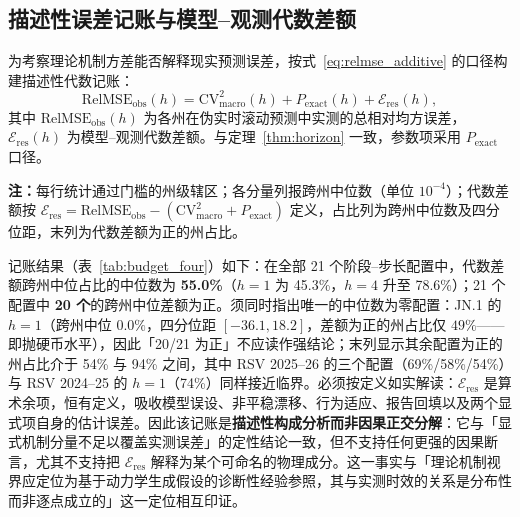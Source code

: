 \documentclass[10pt,UTF8,a4paper,zihao=-4]{ctexart}
\theoremstyle{plain}
\theoremstyle{definition}
\theoremstyle{remark}
\begin{document}
\begin{table}[htbp]
\centering
\footnotesize
\setlength{\tabcolsep}{4pt}
\caption{各阶段州级中位机制视界的联合自助 95\% 区间（同时传播辖区抽样变异与增长乘子估计误差）}
\label{tab:joint_ci}

\end{table}

\begin{table}[htbp]
\centering
\footnotesize
\setlength{\tabcolsep}{4pt}
\caption{准入门槛放宽后各阶段州级中位机制视界（周）与参与辖区数（括号内为 $n$）}
\label{tab:threshold_sweep}

\end{table}

\subsection{描述性误差记账与模型--观测代数差额}\label{sec:budget}

为考察理论机制方差能否解释现实预测误差，按式~\eqref{eq:relmse_additive} 的口径构建描述性代数记账：
\begin{equation}
\text{RelMSE}_{\text{obs}}(h) = \text{CV}^2_{\text{macro}}(h) + P_{\text{exact}}(h) + \mathcal{E}_{\text{res}}(h),
\label{eq:full_budget}
\end{equation}
其中 $\text{RelMSE}_{\text{obs}}(h)$ 为各州在伪实时滚动预测中实测的总相对均方误差，$\mathcal{E}_{\text{res}}(h)$ 为模型--观测代数差额。与定理~\ref{thm:horizon} 一致，参数项采用 $P_{\text{exact}}$ 口径。

\begin{table}[htbp]
\centering
\footnotesize
\caption{两项显式模型分量与模型--观测代数差额的描述性误差记账州级分解}
\label{tab:budget_four}
\setlength{\tabcolsep}{3pt}

\vspace{2pt}
\begin{flushleft}
\scriptsize \textbf{注：}每行统计通过门槛的州级辖区；各分量列报跨州中位数（单位 $10^{-4}$）；代数差额按 $\mathcal{E}_{\text{res}} = \text{RelMSE}_{\text{obs}} - (\text{CV}^2_{\text{macro}} + P_{\text{exact}})$ 定义，占比列为跨州中位数及四分位距，末列为代数差额为正的州占比。
\end{flushleft}
\end{table}

记账结果（表~\ref{tab:budget_four}）如下：在全部 21 个阶段--步长配置中，代数差额跨州中位占比的中位数为 \textbf{55.0\%}（$h=1$ 为 45.3\%，$h=4$ 升至 78.6\%）；21 个配置中 \textbf{20 个}的跨州中位差额为正。须同时指出唯一的中位数为零配置：JN.1 的 $h=1$（跨州中位 $0.0\%$，四分位距 $[-36.1, 18.2]$，差额为正的州占比仅 $49\%$——即抛硬币水平），因此「20/21 为正」不应读作强结论；末列显示其余配置为正的州占比介于 54\% 与 94\% 之间，其中 RSV 2025--26 的三个配置（69\%/58\%/54\%）与 RSV 2024--25 的 $h=1$（74\%）同样接近临界。必须按定义如实解读：$\mathcal{E}_{\text{res}}$ 是算术余项，恒有定义，吸收模型误设、非平稳漂移、行为适应、报告回填以及两个显式项自身的估计误差。因此该记账是\textbf{描述性构成分析而非因果正交分解}：它与「显式机制分量不足以覆盖实测误差」的定性结论一致，但不支持任何更强的因果断言，尤其不支持把 $\mathcal{E}_{\text{res}}$ 解释为某个可命名的物理成分。这一事实与「理论机制视界应定位为基于动力学生成假设的诊断性经验参照，其与实测时效的关系是分布性而非逐点成立的」这一定位相互印证。
\end{document}
